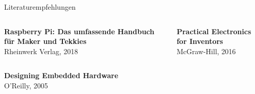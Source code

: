{
\small
\setlength{\fboxsep}{0pt}

\begin{frame}{Literaturempfehlungen}
    \begin{columns}


    \end{columns}

    \vskip 0.6cm

    \begin{columns}
        \textbf{Raspberry Pi: Das umfassende Handbuch für Maker und Tekkies} \\ Rheinwerk Verlag, 2018

        \textbf{Practical Electronics for Inventors} \\ McGraw-Hill, 2016
    \end{columns}

    \vskip 0.6cm

    \begin{columns}
        \textbf{Designing Embedded Hardware} \\ O'Reilly, 2005
    \end{columns}
\end{frame}
}

